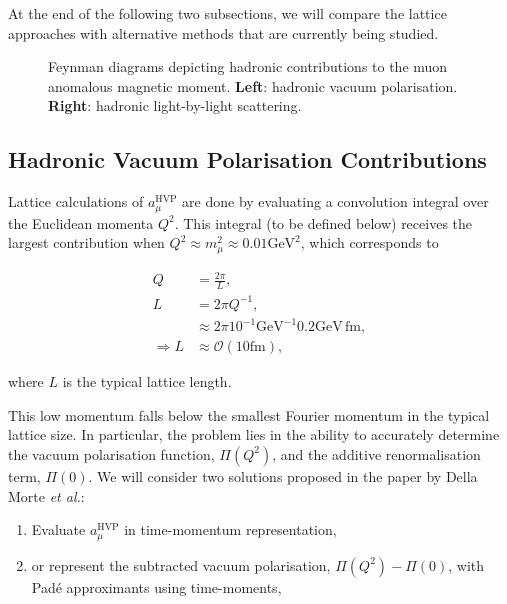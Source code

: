 \documentclass{article}
\numberwithin{equation}{section} %
\begin{document}
At the end of the following two subsections, we will compare the lattice approaches with alternative methods that are currently being studied.


\begin{figure}[t]
    \centering
    \qquad
    \caption{Feynman diagrams depicting hadronic contributions to the muon anomalous magnetic moment. \textbf{Left}: hadronic vacuum polarisation. \textbf{Right}: hadronic light-by-light scattering.}%
    \label{hadfeynman}%
\end{figure}


\subsection{Hadronic Vacuum Polarisation Contributions}\label{hvp}

Lattice calculations of $a_\mu^\mathrm{HVP}$ are done by evaluating a convolution integral over the Euclidean momenta $Q^2$. This integral (to be defined below) receives the largest contribution when $Q^2\approx m_\mu^2\approx 0.01\mathrm{GeV}^2$, which corresponds to 

\begin{equation}
\begin{split}
Q &= \frac{2\pi}{L},\\
L &= 2\pi Q^{-1},\\
&\approx 2\pi 10^{-1} \mathrm{GeV}^{-1} 0.2 \mathrm{GeV \, fm},\\
\Rightarrow L &\approx \mathcal{O}(10\mathrm{fm}), 
\end{split}
\end{equation}

\noindent where $L$ is the typical lattice length\cite{dellamorte}.

This low momentum falls below the smallest Fourier momentum in the typical lattice size. In particular, the problem lies in the ability to accurately determine the vacuum polarisation function, $\Pi(Q^2)$, and the additive renormalisation term, $\Pi(0)$. We will consider two solutions proposed in the paper by Della Morte \textit{et al.}\cite{dellamorte}: 


\begin{enumerate}
\item Evaluate $a_\mu^\mathrm{HVP}$ in time-momentum representation,
\item or represent the subtracted vacuum polarisation, $\Pi(Q^2)-\Pi(0)$, with Pad\'{e} approximants using time-moments,
\end{enumerate}
\end{document}
